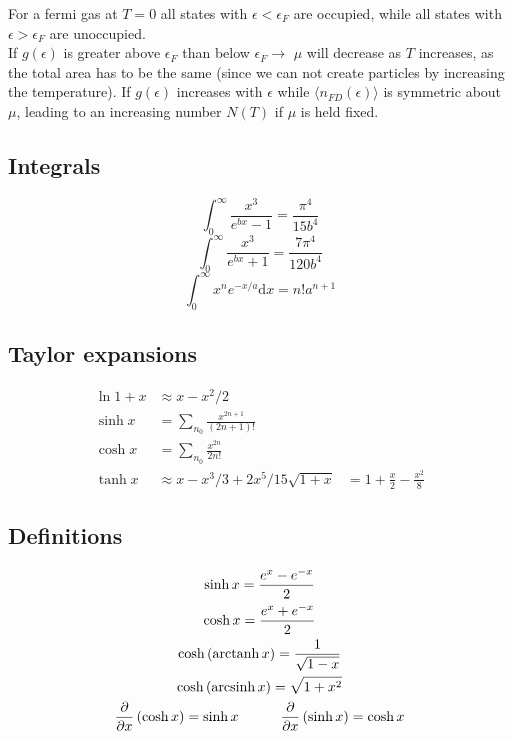 \documentclass[a4paper, norsk, 8pt]{article}
\DeclareMathOperator{\arcsinh}{arcsinh}
\DeclareMathOperator{\arctanh}{arctanh}
\begin{document}
\begin{multicols*}{3}
For a fermi gas at $T=0$ all states with $\epsilon < \epsilon_F$ are occupied, while all states with $\epsilon > \epsilon_F$ are unoccupied.\\
If $g(\epsilon)$ is greater above $\epsilon_F$ than below $\epsilon_F \rightarrow$ $\mu$ will decrease as $T$ increases, as the total area has to be the same (since we can not create particles by increasing the temperature).
If $g(\epsilon)$ increases with $\epsilon$ while $\langle n_{FD}(\epsilon) \rangle$ is symmetric about $\mu$, leading to an increasing number $N(T)$ if $\mu$ is held fixed.

\subsection*{\footnotesize  Integrals}
$$ \int_0^{\infty} \frac{x^3}{e^{bx}-1} = \frac{\pi^4}{15b^4}$$
$$ \int_0^{\infty} \frac{x^3}{e^{bx}+1} = \frac{7\pi^4}{120b^4}$$
$$ \int_0^{\infty} x^n e^{-x/a} \mbox{d}x = n! a^{n+1}$$

\subsection*{\footnotesize  Taylor expansions}
\begin{align*}
  \ln{1+x} &\approx x - x^2/2 \\
  \sinh{x} &= \sum_{n_0} \frac{x^{2n+1}}{(2n+1)!} \\
  \cosh{x} &= \sum_{n_0} \frac{x^{2n}}{2n!}\\
  \tanh{x} &\approx x-x^3/3 + 2x^5/15
  \sqrt{1+x} &= 1 + \frac{x}{2} - \frac{x^2}{8}
\end{align*}

\subsection*{\footnotesize  Definitions}

\begin{gather*}
  \sinh{x} = \frac{e^{x}-e^{-x}}{2} \\
  \cosh{x} = \frac{e^{x}+e^{-x}}{2} \\
  \cosh{\left( \arctanh{x} \right)} = \frac{1}{\sqrt{1-x}} \\
  \cosh{\left( \arcsinh{x} \right)} = \sqrt{1+x^2} \\
  \pdv{}{x}\left( \cosh{x} \right) = \sinh{x} \quad\qquad \pdv{}{x}\left( \sinh{x} \right) = \cosh{x}
\end{gather*}


\end{multicols*}
\end{document}
